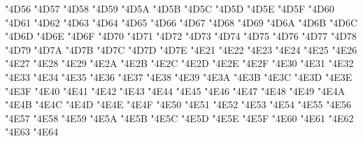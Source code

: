 {\Uchar\jis"4D56 %
\Uchar\jis"4D57 %
\Uchar\jis"4D58 %
\Uchar\jis"4D59 %
\Uchar\jis"4D5A %
\Uchar\jis"4D5B %
\Uchar\jis"4D5C %
\Uchar\jis"4D5D %
\Uchar\jis"4D5E %
\Uchar\jis"4D5F %
\Uchar\jis"4D60 %
\Uchar\jis"4D61 %
\Uchar\jis"4D62 %
\Uchar\jis"4D63 %
\Uchar\jis"4D64 %
\Uchar\jis"4D65 %
\Uchar\jis"4D66 %
\Uchar\jis"4D67 %
\Uchar\jis"4D68 %
\Uchar\jis"4D69 %
\Uchar\jis"4D6A %
\Uchar\jis"4D6B %
\Uchar\jis"4D6C %
\Uchar\jis"4D6D %
\Uchar\jis"4D6E %
\Uchar\jis"4D6F %
\Uchar\jis"4D70 %
\Uchar\jis"4D71 %
\Uchar\jis"4D72 %
\Uchar\jis"4D73 %
\Uchar\jis"4D74 %
\Uchar\jis"4D75 %
\Uchar\jis"4D76 %
\Uchar\jis"4D77 %
\Uchar\jis"4D78 %
\Uchar\jis"4D79 %
\Uchar\jis"4D7A %
\Uchar\jis"4D7B %
\Uchar\jis"4D7C %
\Uchar\jis"4D7D %
\Uchar\jis"4D7E %
\Uchar\jis"4E21 %
\Uchar\jis"4E22 %
\Uchar\jis"4E23 %
\Uchar\jis"4E24 %
\Uchar\jis"4E25 %
\Uchar\jis"4E26 %
\Uchar\jis"4E27 %
\Uchar\jis"4E28 %
\Uchar\jis"4E29 %
\Uchar\jis"4E2A %
\Uchar\jis"4E2B %
\Uchar\jis"4E2C %
\Uchar\jis"4E2D %
\Uchar\jis"4E2E %
\Uchar\jis"4E2F %
\Uchar\jis"4E30 %
\Uchar\jis"4E31 %
\Uchar\jis"4E32 %
\Uchar\jis"4E33 %
\Uchar\jis"4E34 %
\Uchar\jis"4E35 %
\Uchar\jis"4E36 %
\Uchar\jis"4E37 %
\Uchar\jis"4E38 %
\Uchar\jis"4E39 %
\Uchar\jis"4E3A %
\Uchar\jis"4E3B %
\Uchar\jis"4E3C %
\Uchar\jis"4E3D %
\Uchar\jis"4E3E %
\Uchar\jis"4E3F %
\Uchar\jis"4E40 %
\Uchar\jis"4E41 %
\Uchar\jis"4E42 %
\Uchar\jis"4E43 %
\Uchar\jis"4E44 %
\Uchar\jis"4E45 %
\Uchar\jis"4E46 %
\Uchar\jis"4E47 %
\Uchar\jis"4E48 %
\Uchar\jis"4E49 %
\Uchar\jis"4E4A %
\Uchar\jis"4E4B %
\Uchar\jis"4E4C %
\Uchar\jis"4E4D %
\Uchar\jis"4E4E %
\Uchar\jis"4E4F %
\Uchar\jis"4E50 %
\Uchar\jis"4E51 %
\Uchar\jis"4E52 %
\Uchar\jis"4E53 %
\Uchar\jis"4E54 %
\Uchar\jis"4E55 %
\Uchar\jis"4E56 %
\Uchar\jis"4E57 %
\Uchar\jis"4E58 %
\Uchar\jis"4E59 %
\Uchar\jis"4E5A %
\Uchar\jis"4E5B %
\Uchar\jis"4E5C %
\Uchar\jis"4E5D %
\Uchar\jis"4E5E %
\Uchar\jis"4E5F %
\Uchar\jis"4E60 %
\Uchar\jis"4E61 %
\Uchar\jis"4E62 %
\Uchar\jis"4E63 %
\Uchar\jis"4E64 %
}
